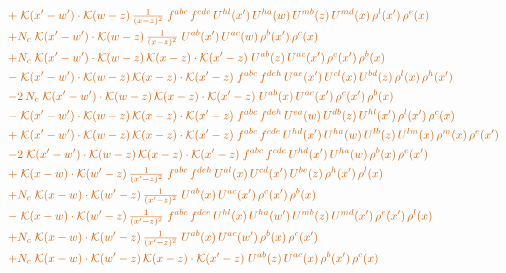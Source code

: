 \documentclass[10pt]{article}
\numberwithin{equation}{section}
\begin{document}
\begin{align}
&\quad{\color{BFK}+\;\mathcal{K}(x'-w')\cdot\mathcal{K}(w-z)\,\tfrac{1}{(x-z)^{2}}\;f^{abc}\,f^{cde}\,U^{hl}(x')\,U^{ha}(w)\,U^{mb}(z)\,U^{md}(x)\,\rho^{l}(x')\,\rho^{e}(x)}\notag\\
&\quad{\color{BFK}+N_c\;\mathcal{K}(x'-w')\cdot\mathcal{K}(w-z)\,\tfrac{1}{(x-z)^{2}}\;U^{ab}(x')\,U^{ac}(w)\,\rho^{b}(x')\,\rho^{c}(x)}\notag\\
&\quad{\color{BFK}+N_c\;\mathcal{K}(x'-w')\cdot\mathcal{K}(w-z)\,\mathcal{K}(x-z)\cdot\mathcal{K}(x'-z)\;U^{ab}(z)\,U^{ac}(x')\,\rho^{c}(x')\,\rho^{b}(x)}\notag\\
&\quad{\color{BFK}-\;\mathcal{K}(x'-w')\cdot\mathcal{K}(w-z)\,\mathcal{K}(x-z)\cdot\mathcal{K}(x'-z)\;f^{abc}\,f^{deh}\,U^{ae}(x')\,U^{cl}(x)\,U^{bd}(z)\,\rho^{l}(x)\,\rho^{h}(x')}\notag\\
&\quad{\color{BFK}-2\,N_c\;\mathcal{K}(x'-w')\cdot\mathcal{K}(w-z)\,\mathcal{K}(x-z)\cdot\mathcal{K}(x'-z)\;U^{ab}(x)\,U^{ac}(x')\,\rho^{c}(x')\,\rho^{b}(x)}\notag\\
&\quad{\color{BFK}-\;\mathcal{K}(x'-w')\cdot\mathcal{K}(w-z)\,\mathcal{K}(x-z)\cdot\mathcal{K}(x'-z)\;f^{abc}\,f^{deh}\,U^{ea}(w)\,U^{db}(z)\,U^{hl}(x')\,\rho^{l}(x')\,\rho^{c}(x)}\notag\\
&\quad{\color{BFK}+\;\mathcal{K}(x'-w')\cdot\mathcal{K}(w-z)\,\mathcal{K}(x-z)\cdot\mathcal{K}(x'-z)\;f^{abc}\,f^{cde}\,U^{hd}(x')\,U^{ha}(w)\,U^{lb}(z)\,U^{lm}(x)\,\rho^{m}(x)\,\rho^{e}(x')}\notag\\
&\quad{\color{BFK}-2\;\mathcal{K}(x'-w')\cdot\mathcal{K}(w-z)\,\mathcal{K}(x-z)\cdot\mathcal{K}(x'-z)\;f^{abc}\,f^{cde}\,U^{hd}(x')\,U^{ha}(w)\,\rho^{b}(x)\,\rho^{e}(x')}\notag\\
&\quad{\color{BFK}+\;\mathcal{K}(x-w)\cdot\mathcal{K}(w'-z)\,\tfrac{1}{(x'-z)^{2}}\;f^{abc}\,f^{deh}\,U^{al}(x)\,U^{cd}(x')\,U^{be}(z)\,\rho^{h}(x')\,\rho^{l}(x)}\notag\\
&\quad{\color{BFK}+N_c\;\mathcal{K}(x-w)\cdot\mathcal{K}(w'-z)\,\tfrac{1}{(x'-z)^{2}}\;U^{ab}(x)\,U^{ac}(x')\,\rho^{c}(x')\,\rho^{b}(x)}\notag\\
&\quad{\color{BFK}-\;\mathcal{K}(x-w)\cdot\mathcal{K}(w'-z)\,\tfrac{1}{(x'-z)^{2}}\;f^{abc}\,f^{dce}\,U^{hl}(x)\,U^{ha}(w')\,U^{mb}(z)\,U^{md}(x')\,\rho^{e}(x')\,\rho^{l}(x)}\notag\\
&\quad{\color{BFK}+N_c\;\mathcal{K}(x-w)\cdot\mathcal{K}(w'-z)\,\tfrac{1}{(x'-z)^{2}}\;U^{ab}(x)\,U^{ac}(w')\,\rho^{b}(x)\,\rho^{c}(x')}\notag\\
&\quad{\color{BFK}+N_c\;\mathcal{K}(x-w)\cdot\mathcal{K}(w'-z)\,\mathcal{K}(x-z)\cdot\mathcal{K}(x'-z)\;U^{ab}(z)\,U^{ac}(x)\,\rho^{b}(x')\,\rho^{c}(x)}\notag\\

\end{align}
\end{document}
